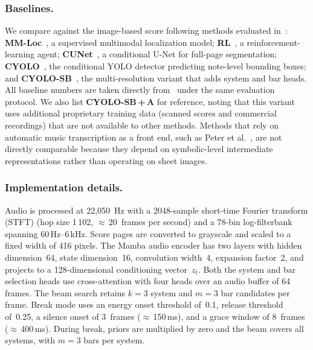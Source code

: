 \subsubsection{Baselines.}
We compare against the image-based score following methods evaluated
in~\cite{henkel2021real}: \textbf{MM-Loc}~\cite{dorfer2016towards}, a
supervised multimodal localization model; \textbf{RL}~\cite{henkel2019score},
a reinforcement-learning agent; \textbf{CUNet}~\cite{henkel2020learning}, a
conditional U-Net for full-page segmentation; \textbf{CYOLO}~\cite{henkel2021multi}, the conditional
YOLO detector predicting note-level bounding boxes; and \textbf{CYOLO-SB}~\cite{henkel2021real}, the multi-resolution variant that adds system and bar heads. All baseline numbers are taken directly from~\cite{henkel2021real} under the same evaluation protocol. We also list \textbf{CYOLO-SB\,+\,A} for reference, noting that this variant uses additional proprietary training data (scanned scores and commercial recordings) that are not available to other methods. Methods that rely on automatic music transcription as a front end, such as Peter et al.~\cite{peter2025pairing}, are not directly comparable because they depend on symbolic-level intermediate representations rather than operating on sheet images.
 
\subsubsection{Implementation details.}
Audio is processed at 22,050~Hz with a 2048-sample short-time Fourier transform (STFT) (hop size 1\,102,
${\approx}\,$20~frames per second) and a 78-bin log-filterbank spanning
60\,Hz--6\,kHz. Score pages are converted to grayscale and scaled to a fixed
width of 416 pixels. The Mamba audio encoder has two layers with hidden
dimension~64, state dimension~16, convolution width~4, expansion factor~2, and projects to a 128-dimensional conditioning vector~$z_t$. Both the system and bar selection heads use cross-attention with four heads over an audio buffer of 64 frames. The beam search retains $k{=}3$ system and $m{=}3$ bar candidates per frame. Break mode uses an energy onset threshold of~0.1, release threshold of~0.25, a silence onset of 3~frames (${\approx}\,$150\,ms), and a grace window of 8~frames (${\approx}\,$400\,ms). During break, priors are multiplied by zero and the beam covers all systems, with $m{=}3$ bars per system.
 
